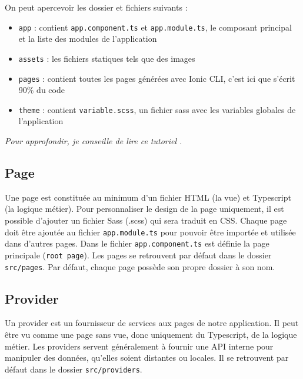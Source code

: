 \documentclass[a4paper, 12pt]{article}
\begin{document}
\bigbreak
On peut apercevoir les dossier et fichiers suivants :
\begin{itemize}
    \item \texttt{app} : contient \texttt{app.component.ts} et \texttt{app.module.ts}, le composant principal et la liste des modules de l'application
    \item \texttt{assets} : les fichiers statiques tels que des images
    \item \texttt{pages} : contient toutes les pages générées avec Ionic CLI, c'est ici que s'écrit 90\% du code
    \item \texttt{theme} : contient \texttt{variable.scss}, un fichier sass avec les variables globales de l'application
\end{itemize}
\textit{Pour approfondir, je conseille de lire ce tutoriel \cite{ref20}.}

\subsection{Page}
Une page est constituée au minimum d'un fichier HTML (la vue) et Typescript (la logique métier). Pour personnaliser le
design de la page uniquement, il est possible d'ajouter un fichier Sass (.scss) qui sera traduit en CSS. Chaque page doit être
ajoutée au fichier \texttt{app.module.ts} pour pouvoir être importée et utilisée dans d'autres pages. Dans le fichier
\texttt{app.component.ts} est définie la page principale (\texttt{root page}). Les pages se retrouvent
par défaut dans le dossier \texttt{src/pages}. Par défaut, chaque page possède son propre dossier à son nom.

\subsection{Provider}
Un provider est un fournisseur de services aux pages de notre application. Il peut être vu comme une page sans vue, donc
uniquement du Typescript, de la logique métier. Les providers servent généralement à fournir une API interne pour
manipuler des données, qu'elles soient distantes ou locales. Il se retrouvent par défaut dans le dossier
\texttt{src/providers}.
\end{document}
